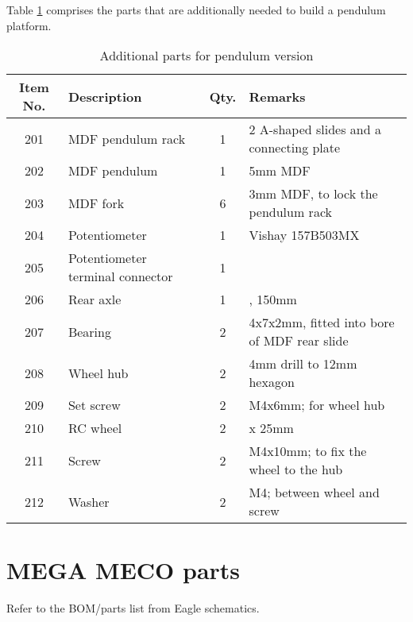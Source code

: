 \documentclass[10pt,a4paper]{article}
\begin{document}
\noindent Table \ref{parts_pendulum} comprises the parts that are additionally needed to build a pendulum platform.
\begin{table}[H]
 \centering
 \begin{tabular}{| c | l | c | l|}
  \hline
  Item No. & Description                      & Qty. & Remarks                                                   \\ \hline
  201      & MDF pendulum rack                & 1    & \footnotesize 2 A-shaped slides and a connecting plate    \\ \hline
  202      & MDF pendulum                     & 1    & \footnotesize 5mm MDF                                     \\ \hline
  203      & MDF fork                         & 6    & \footnotesize 3mm MDF, to lock the pendulum rack          \\ \hline
  204      & Potentiometer                    & 1    & \footnotesize Vishay 157B503MX                            \\ \hline
  205      & Potentiometer terminal connector & 1    &                                                           \\ \hline
  206      & Rear axle                        & 1    & \footnotesize \diameter4mm, 150mm                         \\ \hline
  207      & Bearing                          & 2    & \footnotesize 4x7x2mm, fitted into bore of MDF rear slide \\ \hline
  208      & Wheel hub                        & 2    & \footnotesize 4mm drill to 12mm hexagon                   \\ \hline
  209      & Set screw                        & 2    & \footnotesize M4x6mm; for wheel hub                       \\ \hline
  210      & RC wheel                         & 2    & \footnotesize \diameter 65mm x 25mm                       \\ \hline
  211      & Screw                            & 2    & \footnotesize M4x10mm; to fix the wheel to the hub        \\ \hline
  212      & Washer                           & 2    & \footnotesize M4; between wheel and screw                 \\ \hline
 \end{tabular}
 \caption{Additional parts for pendulum version}\label{parts_pendulum}
\end{table}

\newpage
\section{MEGA MECO parts}

Refer to the BOM/parts list from Eagle schematics.
\end{document}
